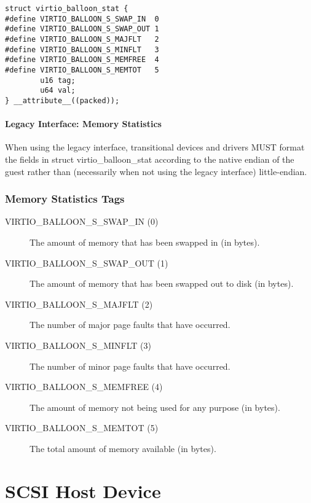 \begin{lstlisting}
struct virtio_balloon_stat {
#define VIRTIO_BALLOON_S_SWAP_IN  0
#define VIRTIO_BALLOON_S_SWAP_OUT 1
#define VIRTIO_BALLOON_S_MAJFLT   2
#define VIRTIO_BALLOON_S_MINFLT   3
#define VIRTIO_BALLOON_S_MEMFREE  4
#define VIRTIO_BALLOON_S_MEMTOT   5
        u16 tag;
        u64 val;
} __attribute__((packed));
\end{lstlisting}

\paragraph{Legacy Interface: Memory Statistics}\label{sec:Device Types / Memory Balloon Device / Device Operation / Memory Statistics / Legacy Interface: Memory Statistics}
When using the legacy interface, transitional devices and drivers
MUST format the fields in struct virtio_balloon_stat
according to the native endian of the guest rather than
(necessarily when not using the legacy interface) little-endian.

\subsubsection{Memory Statistics Tags}\label{sec:Device Types / Memory Balloon Device / Device Operation / Memory Statistics Tags}

\begin{description}
\item[VIRTIO_BALLOON_S_SWAP_IN (0)] The amount of memory that has been
  swapped in (in bytes).

\item[VIRTIO_BALLOON_S_SWAP_OUT (1)] The amount of memory that has been
  swapped out to disk (in bytes).

\item[VIRTIO_BALLOON_S_MAJFLT (2)] The number of major page faults that
  have occurred.

\item[VIRTIO_BALLOON_S_MINFLT (3)] The number of minor page faults that
  have occurred.

\item[VIRTIO_BALLOON_S_MEMFREE (4)] The amount of memory not being used
  for any purpose (in bytes).

\item[VIRTIO_BALLOON_S_MEMTOT (5)] The total amount of memory available
  (in bytes).
\end{description}

\section{SCSI Host Device}\label{sec:Device Types / SCSI Host Device}


